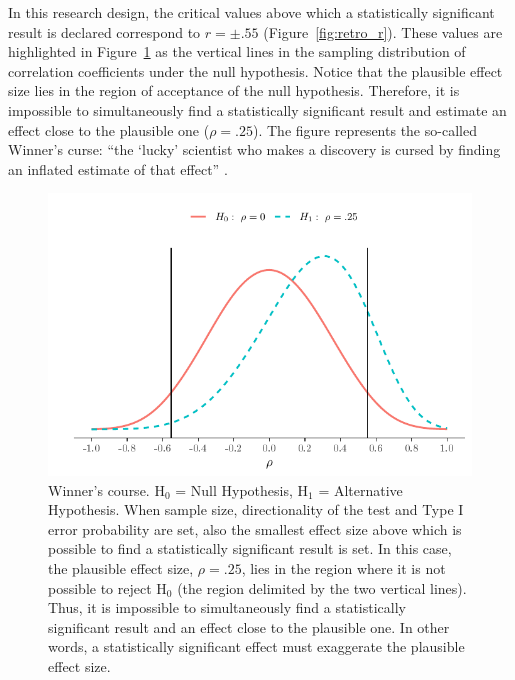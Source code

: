 \documentclass{article}\usepackage[]{graphicx}\usepackage[]{color}
\makeatletter
\def\maxwidth{ %
  \ifdim\Gin@nat@width>\linewidth
    \linewidth
  \else
    \Gin@nat@width
  \fi
}
\newenvironment{knitrout}{}{} %
\makeatother
\begin{document}
In this research design, the critical values above which a statistically significant result is declared correspond to $r=\pm .55$ (Figure~\ref{fig:retro_r}).  These values are highlighted in Figure~\ref{fig:Plot_winner} as the vertical lines in the sampling distribution of correlation coefficients under the null hypothesis. Notice that the plausible effect size lies in the region of acceptance of the null hypothesis. Therefore, it is impossible to simultaneously find a statistically significant result and estimate an effect close to the plausible one ($\rho=.25$). The figure represents the so-called Winner’s curse: “the ‘lucky’ scientist who makes a discovery is cursed by finding an inflated estimate of that effect” \parencite{buttonPowerFailureWhy2013}.



\begin{knitrout}
\color{fgcolor}\begin{figure}[!h]

{\centering \includegraphics[width=\maxwidth]{figure/Plot_winner-1} 

}

\caption[Winner's course]{Winner's course. H$_0$ = Null Hypothesis, H$_1$ = Alternative Hypothesis. When sample size, directionality of the test and Type I error probability are set, also the smallest effect size above which is possible to find a statistically significant result is set. In this case, the plausible effect size, $\rho=.25$, lies in the region where it is not possible to reject H$_0$ (the region delimited by the two vertical lines). Thus, it is impossible to simultaneously find a statistically significant result and an effect close to the plausible one. In other words, a statistically significant effect must exaggerate the plausible effect size.}\label{fig:Plot_winner}
\end{figure}


\end{knitrout}
\end{document}
